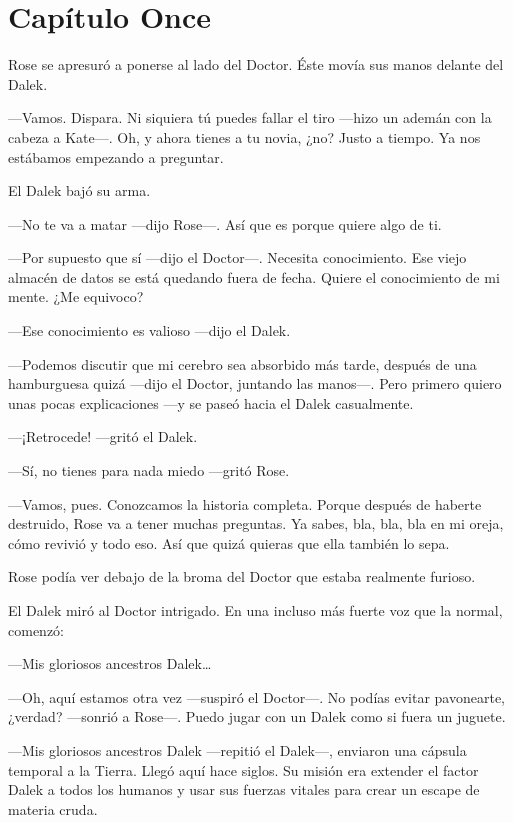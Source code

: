 \chapter*{Capítulo Once}

Rose se apresuró a ponerse al lado del Doctor. Éste movía sus manos
delante del Dalek.

---Vamos. Dispara. Ni siquiera tú puedes fallar el tiro ---hizo un ademán
con la cabeza a Kate---. Oh, y ahora tienes a tu novia, ¿no? Justo a
tiempo. Ya nos estábamos empezando a preguntar.

El Dalek bajó su arma.

---No te va a matar ---dijo Rose---. Así que es porque quiere algo de ti.

---Por supuesto que sí ---dijo el Doctor---. Necesita conocimiento. Ese
viejo almacén de datos se está quedando fuera de fecha. Quiere el
conocimiento de mi mente. ¿Me equivoco?

---Ese conocimiento es valioso ---dijo el Dalek.

---Podemos discutir que mi cerebro sea absorbido más tarde, después de
una hamburguesa quizá ---dijo el Doctor, juntando las manos---. Pero
primero quiero unas pocas explicaciones ---y se paseó hacia el Dalek
casualmente.

---¡Retrocede! ---gritó el Dalek.

---Sí, no tienes para nada miedo ---gritó Rose.

---Vamos, pues. Conozcamos la historia completa. Porque después de
haberte destruido, Rose va a tener muchas preguntas. Ya sabes, bla, bla,
bla en mi oreja, cómo revivió y todo eso. Así que quizá quieras que ella
también lo sepa.

Rose podía ver debajo de la broma del Doctor que estaba realmente
furioso.

El Dalek miró al Doctor intrigado. En una incluso más fuerte voz que la
normal, comenzó:

---Mis gloriosos ancestros Dalek\ldots{}

---Oh, aquí estamos otra vez ---suspiró el Doctor---. No podías evitar
pavonearte, ¿verdad? ---sonrió a Rose---. Puedo jugar con un Dalek como si
fuera un juguete.

---Mis gloriosos ancestros Dalek ---repitió el Dalek---, enviaron una
cápsula temporal a la Tierra. Llegó aquí hace siglos. Su misión era
extender el factor Dalek a todos los humanos y usar sus fuerzas vitales
para crear un escape de materia cruda.

